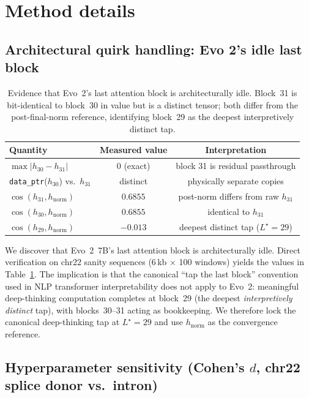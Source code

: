 \documentclass{article}
\theoremstyle{plain}
\theoremstyle{definition}
\theoremstyle{remark}
\newcommand{\hnorm}{h_{\mathrm{norm}}}
\begin{document}
\section{Method details}
\label{app:method}

\subsection{Architectural quirk handling: Evo 2’s idle last
block}
\label{app:architectural-quirk}
\begin{table}[h]
\caption{Evidence that Evo~2's last attention block is architecturally
idle. Block~31 is bit-identical to block~30 in value but is a distinct
tensor; both differ from the post-final-norm reference, identifying
block~29 as the deepest interpretively distinct tap.}
\label{tab:idle-block}
\centering
\small
\begin{tabular}{@{}lcc@{}}
\toprule
Quantity & Measured value & Interpretation \\
\midrule
$\max\bigl|h_{30}-h_{31}\bigr|$ & $0$ (exact) &
   block 31 is residual passthrough \\
\texttt{data\_ptr}($h_{30}$) vs.\ $h_{31}$ & distinct &
   physically separate copies \\
$\cos(h_{31}, \hnorm)$ & $0.6855$ &
   post-norm differs from raw $h_{31}$ \\
$\cos(h_{30}, \hnorm)$ & $0.6855$ &
   identical to $h_{31}$ \\
$\cos(h_{29}, \hnorm)$ & $-0.013$ &
   deepest distinct tap ($L^{\star}=29$) \\
\bottomrule
\end{tabular}
\end{table}
We discover that Evo~2~7B's last attention block is architecturally
idle. Direct verification on chr22 sanity sequences (6\,kb $\times$ 100
windows) yields the values in Table~\ref{tab:idle-block}. The
implication is that the canonical ``tap the last block'' convention
used in NLP transformer interpretability does not apply to Evo~2:
meaningful deep-thinking computation completes at block~29 (the deepest
\emph{interpretively distinct} tap), with blocks~30--31 acting as
bookkeeping. We therefore lock the canonical deep-thinking tap at
$L^{\star}=29$ and use $\hnorm$ as the convergence reference.



\subsection{Hyperparameter sensitivity (Cohen's $d$, chr22 splice donor vs.\ intron)}
\label{app:gamma-sweep}
\end{document}
